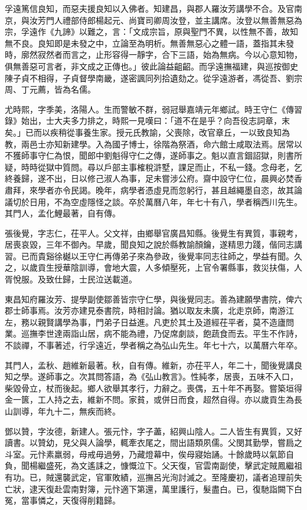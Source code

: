 \begin{pinyinscope}
孚遠篤信良知，而惡夫援良知以入佛者。知建昌，與郡人羅汝芳講學不合。及官南京，與汝芳門人禮部侍郎楊起元、尚寶司卿周汝登，並主講席。汝登以無善無惡為宗，孚遠作《九諦》以難之，言：「文成宗旨，原與聖門不異，以性無不善，故知無不良。良知即是未發之中，立論至為明析。無善無惡心之體一語，蓋指其未發時，廓然寂然者而言之，止形容得一靜字，合下三語，始為無病。今以心意知物，俱無善惡可言者，非文成之正傳也。」彼此論益齟齠。而孚遠撫福建，與巡按御史陳子貞不相得，子貞督學南畿，遂密諷同列拾遺劾之。從孚遠游者，馮從吾、劉宗周、丁元薦，皆為名儒。

尤時熙，字季美，洛陽人。生而警敏不群，弱冠舉嘉靖元年鄉試。時王守仁《傳習錄》始出，士大夫多力排之，時熙一見嘆曰：「道不在是乎？向吾役志詞章，末矣。」已而以疾稍從事養生家。授元氏教諭，父喪除，改官章丘，一以致良知為教，兩邑士亦知新建學。入為國子博士，徐階為祭酒，命六館士咸取法焉。居常以不獲師事守仁為恨，聞郎中劉魁得守仁之傳，遂師事之。魁以直言錮詔獄，則書所疑，時時從獄中質問。尋以戶部主事榷稅滸墅，課足而止，不私一錢。念母老，乞終養歸，遂不出，日以修己淑人為事，足未嘗涉公府。齋中設守仁位，晨興必焚香肅拜，來學者亦令民謁。晚年，病學者憑虛見而忽躬行，甚且越繩墨自恣，故其論議切於日用，不為空虛隱怪之談。卒於萬曆八年，年七十有八，學者稱西川先生。其門人，孟化鯉最著，自有傳。

張後覺，字志仁，茌平人。父文祥，由鄉舉官廣昌知縣。後覺生有異質，事親考，居喪哀毀，三年不御內。早歲，聞良知之說於縣教諭顏鑰，遂精思力踐，偕同志講習。已而貴谿徐樾以王守仁再傳弟子來為參政，後覺率同志往師之，學益有聞。久之，以歲貢生授華陰訓導，會地大震，人多傾壓死，上官令署縣事，救災扶傷，人胥悅服。及致仕歸，士民泣送載道。

東昌知府羅汝芳、提學副使鄒善皆宗守仁學，與後覺同志。善為建願學書院，俾六郡士師事焉。汝芳亦建見泰書院，時相討論。猶以取友未廣，北走京師，南游江左，務以親賢講學為事，門弟子日益進。凡吏於其土及道經茌平者，莫不造廬問業。巡撫李世達兩詣山居，病不能為禮，乃促席劇談，飽蔬食而去。平生不作詩，不談禪，不事著述，行孚遠近，學者稱之為弘山先生。年七十六，以萬曆六年卒。

其門人，孟秋、趙維新最著。秋，自有傳。維新，亦茌平人，年二十，聞後覺講良知之學。遂師事之。次其問答語，為《弘山教言》。性純孝，居喪，五味不入口，柴毀骨立，杖而後起。鄉人欲舉其孝行，力辭之。喪偶，五十年不再娶。嘗築垣得金一篋，工人持之去，維新不問。家貧，或併日而食，超然自得。亦以歲貢生為長山訓導，年九十二，無疾而終。

鄧以贊，字汝德，新建人。張元忭，字子藎，紹興山陰人。二人皆生有異質，又好讀書。以贊幼，見父與人論學，輒牽衣尾之，間出語類夙儒。父閔其勤學，嘗扃之斗室。元忭素羸弱，母戒毋過勞，乃藏燈幕中，俟母寢始誦。十餘歲時以氣節自負，聞楊繼盛死，為文遙誄之，慷慨泣下。父天復，官雲南副使，擊武定賊鳳繼祖有功。已，賊還襲武定，官軍敗績，巡撫呂光洵討滅之。至隆慶初，議者追理前失亡狀，逮天復赴雲南對簿，元忭適下第還，萬里護行，髮盡白。已，復馳詣闕下白冤，當事憐之，天復得削籍歸。


\end{pinyinscope}
